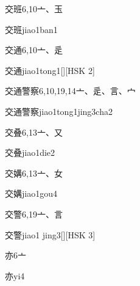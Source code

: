 \begin{entry}{交班}{6,10}{⼇、⽟}
  \begin{phonetics}{交班}{jiao1ban1}
  \end{phonetics}
\end{entry}

\begin{entry}{交通}{6,10}{⼇、⾡}
  \begin{phonetics}{交通}{jiao1tong1}[][HSK 2]
  \end{phonetics}
\end{entry}

\begin{entry}{交通警察}{6,10,19,14}{⼇、⾡、⾔、⼧}
  \begin{phonetics}{交通警察}{jiao1tong1jing3cha2}
  \end{phonetics}
\end{entry}

\begin{entry}{交叠}{6,13}{⼇、⼜}
  \begin{phonetics}{交叠}{jiao1die2}
  \end{phonetics}
\end{entry}

\begin{entry}{交媾}{6,13}{⼇、⼥}
  \begin{phonetics}{交媾}{jiao1gou4}
  \end{phonetics}
\end{entry}

\begin{entry}{交警}{6,19}{⼇、⾔}
  \begin{phonetics}{交警}{jiao1 jing3}[][HSK 3]
  \end{phonetics}
\end{entry}

\begin{entry}{亦}{6}{⼇}
  \begin{phonetics}{亦}{yi4}
  \end{phonetics}
\end{entry}

